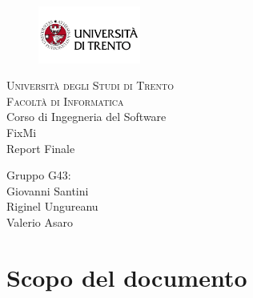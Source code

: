 \documentclass{report}
\begin{document}
	
	
	\begin{titlepage}
		\begin{figure}[t]
			\centering\includegraphics[width=0.3\textwidth]{images/unitn-logo}
		\end{figure}
		\begin{center}
			\textsc{ \LARGE{Università degli Studi di Trento \\}}
			\textsc{ \LARGE{Facoltà di Informatica\\ }}
			\textnormal{ \LARGE{Corso di Ingegneria del Software\\}}
			\vspace{30mm}
			\fontsize{10mm}{7mm}\selectfont 
			\textup{FixMi \\ Report Finale}\\
		\end{center}
		
		\vspace{25mm}
		
		\centering
		\large Gruppo G43: \\ Giovanni Santini\\ Riginel Ungureanu \\ Valerio Asaro
		
		\vspace{20mm}
		
		
	\end{titlepage}
	
	
	
	
	\pagestyle{fancy}
	\fancyhead[R]{\chaptername\ \thechapter}  %
	
	\tableofcontents
	\newpage
	
	
	
	\section{Scopo del documento}
	
\end{document}
